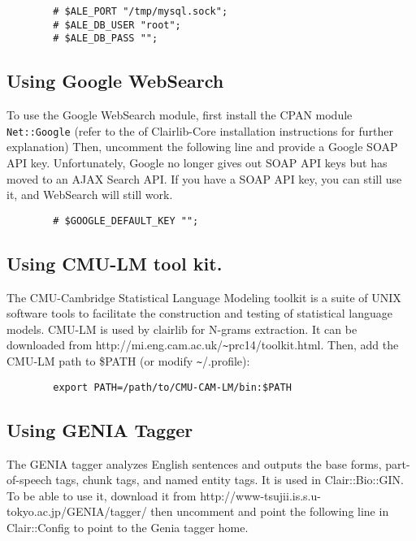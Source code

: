 \begin{verbatim}
        # $ALE_PORT "/tmp/mysql.sock";
        # $ALE_DB_USER "root";
        # $ALE_DB_PASS "";
\end{verbatim}
\subsection*{Using Google WebSearch\label{Using_Google_WebSearch}}


To use the Google WebSearch module, first install the CPAN module \texttt{Net::Google} (refer to the of Clairlib-Core installation instructions for further explanation) Then, uncomment the following line and provide a Google SOAP API key. Unfortunately, Google no longer gives out SOAP API keys but has moved to an AJAX Search API. If you have a SOAP API key, you can still use it, and WebSearch will still work.

\begin{verbatim}
        # $GOOGLE_DEFAULT_KEY "";
\end{verbatim}
\subsection*{Using CMU-LM tool kit.\label{Using_CMU-LM_tool_kit_}}


The CMU-Cambridge Statistical Language Modeling toolkit is a suite of UNIX software tools to facilitate the construction and testing of statistical language models. CMU-LM is used by clairlib for N-grams extraction. It can be downloaded from \textsf{http://mi.eng.cam.ac.uk/\texttt{\~{}}prc14/toolkit.html}. Then, add the CMU-LM path to \$PATH (or modify \texttt{\~{}}/.profile):

\begin{verbatim}
        export PATH=/path/to/CMU-CAM-LM/bin:$PATH
\end{verbatim}
\subsection*{Using GENIA Tagger\label{Using_GENIA_Tagger}}


The GENIA tagger analyzes English sentences and outputs the base forms, part-of-speech tags, chunk tags, and named entity tags. It is used in Clair::Bio::GIN. To be able to use it, download it from \textsf{http://www-tsujii.is.s.u-tokyo.ac.jp/GENIA/tagger/} then uncomment and point the following line in Clair::Config to point to the Genia tagger home.

